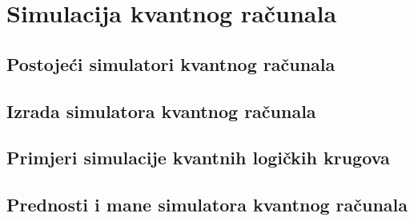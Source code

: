 \chapter{Simulacija kvantnog računala}

\section{Postojeći simulatori kvantnog računala}
\section{Izrada simulatora kvantnog računala}
\section{Primjeri simulacije kvantnih logičkih krugova}
\section{Prednosti i mane simulatora kvantnog računala}